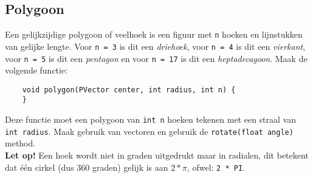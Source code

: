 \subsection{Polygoon}
Een gelijkzijdige polygoon of veelhoek is een figuur met \texttt{n} hoeken en lijnstukken van gelijke lengte. Voor \texttt{n = 3} is dit een \textit{driehoek}, voor \texttt{n = 4} is dit een \textit{vierkant}, voor \texttt{n = 5} is dit een \textit{pentagon} en voor \texttt{n = 17} is dit een \textit{heptadecagoon}. Maak de volgende functie:
\begin{lstlisting}
	void polygon(PVector center, int radius, int n) {
	}
\end{lstlisting}
Deze functie moet een polygoon van \texttt{int n} hoeken tekenen met een straal van \texttt{int radius}. Maak gebruik van vectoren en gebruik de \texttt{rotate(float angle)} method. \\
\textbf{Let op!} Een hoek wordt niet in graden uitgedrukt maar in radialen, dit betekent dat \'e\'en cirkel (dus 360 graden) gelijk is aan $2 * \pi$, ofwel: \texttt{2 * PI}.




